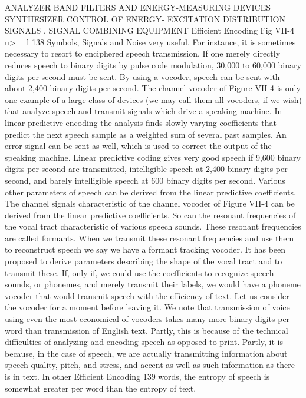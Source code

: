 {{{ANALYZER
BAND FILTERS AND
ENERGY-MEASURING DEVICES
SYNTHESIZER
CONTROL OF ENERGY- EXCITATION
DISTRIBUTION SIGNALS , SIGNAL
COMBINING
EQUIPMENT
Efficient Encoding
Fig VII-4
u> ~~l
138
Symbols, Signals and Noise
very useful. For instance, it is sometimes necessary to resort to
enciphered speech transmission. If one merely directly reduces
speech to binary digits by pulse code modulation, 30,000 to 60,000
binary digits per second must be sent. By using a vocoder, speech
can be sent with about 2,400 binary digits per second.
The channel vocoder of Figure VII-4 is only one example of a
large class of devices (we may call them all vocoders, if we wish)
that analyze speech and transmit signals which drive a speaking
machine. In linear predictive encoding the analysis finds slowly
varying coefficients that predict the next speech sample as a
weighted sum of several past samples. An error signal can be sent
as well, which is used to correct the output of the speaking machine.
Linear predictive coding gives very good speech if 9,600 binary
digits per second are transmitted, intelligible speech at 2,400 binary
digits per second, and barely intelligible speech at 600 binary
digits per second.
Various other parameters of speech can be derived from the
linear predictive coefficients. The channel signals characteristic
of the channel vocoder of Figure VII-4 can be derived from the
linear predictive coefficients. So can the resonant frequencies of
the vocal tract characteristic of various speech sounds. These
resonant frequencies are called formants. When we transmit these
resonant frequencies and use them to reconstruct speech we say
we have a formant tracking vocoder. It has been proposed to
derive parameters describing the shape of the vocal tract and to
transmit these. If, only if, we could use the coefficients to recognize
speech sounds, or phonemes, and merely transmit their labels, we
would have a phoneme vocoder that would transmit speech with
the efficiency of text.
Let us consider the vocoder for a moment before leaving it.
We note that transmission of voice using even the most economical
of vocoders takes many more binary digits per word than
transmission of English text. Partly, this is because of the technical
difficulties of analyzing and encoding speech as opposed to print.
Partly, it is because, in the case of speech, we are actually transmitting
information about speech quality, pitch, and stress, and
accent as well as such information as there is in text. In other
Efficient Encoding 139
words, the entropy of speech is somewhat greater per word than
the entropy of text.
}}}
